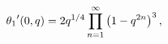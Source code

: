 \[\mathop{\theta_{1}\/}\nolimits'\!\left(0,q\right)=2q^{1/4}\prod\limits_{n=1}^{%
\infty}\left(1-q^{2n}\right)^{3},\]